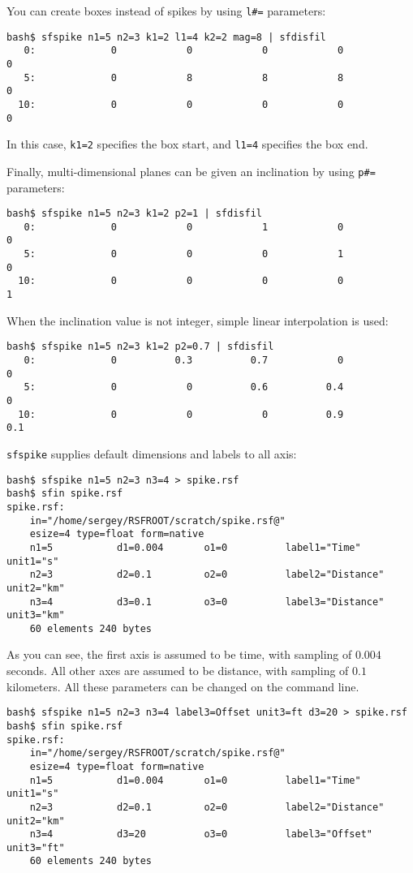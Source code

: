 You can create boxes instead of spikes by using \texttt{l\#=}
parameters:
\begin{verbatim}
bash$ sfspike n1=5 n2=3 k1=2 l1=4 k2=2 mag=8 | sfdisfil
   0:             0            0            0            0            0
   5:             0            8            8            8            0
  10:             0            0            0            0            0
\end{verbatim}
In this case, \texttt{k1=2} specifies the box start, and \texttt{l1=4}
specifies the box end.

Finally, multi-dimensional planes can be given an inclination by using \texttt{p\#=} parameters:
\begin{verbatim}
bash$ sfspike n1=5 n2=3 k1=2 p2=1 | sfdisfil
   0:             0            0            1            0            0
   5:             0            0            0            1            0
  10:             0            0            0            0            1
\end{verbatim}
When the inclination value is not integer, simple linear interpolation is used:
\begin{verbatim}
bash$ sfspike n1=5 n2=3 k1=2 p2=0.7 | sfdisfil
   0:             0          0.3          0.7            0            0
   5:             0            0          0.6          0.4            0
  10:             0            0            0          0.9          0.1
\end{verbatim}

\texttt{sfspike} supplies default dimensions and labels to all axis:
\begin{verbatim}
bash$ sfspike n1=5 n2=3 n3=4 > spike.rsf
bash$ sfin spike.rsf
spike.rsf:
    in="/home/sergey/RSFROOT/scratch/spike.rsf@"
    esize=4 type=float form=native 
    n1=5           d1=0.004       o1=0          label1="Time" unit1="s" 
    n2=3           d2=0.1         o2=0          label2="Distance" unit2="km" 
    n3=4           d3=0.1         o3=0          label3="Distance" unit3="km" 
	60 elements 240 bytes
\end{verbatim}
As you can see, the first axis is assumed to be time, with sampling of
$0.004$ seconds. All other axes are assumed to be distance, with
sampling of $0.1$ kilometers. All these parameters can be changed on
the command line.
\begin{verbatim}
bash$ sfspike n1=5 n2=3 n3=4 label3=Offset unit3=ft d3=20 > spike.rsf
bash$ sfin spike.rsf
spike.rsf:
    in="/home/sergey/RSFROOT/scratch/spike.rsf@"
    esize=4 type=float form=native 
    n1=5           d1=0.004       o1=0          label1="Time" unit1="s" 
    n2=3           d2=0.1         o2=0          label2="Distance" unit2="km" 
    n3=4           d3=20          o3=0          label3="Offset" unit3="ft" 
	60 elements 240 bytes
\end{verbatim}

